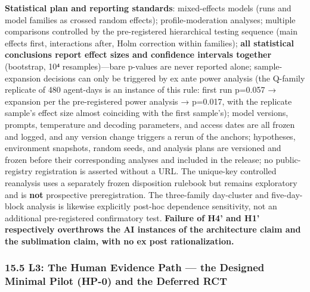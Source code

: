 \documentclass[
  11pt]{article}
\begin{document}
\textbf{Statistical plan and reporting standards}: mixed-effects models
(runs and model families as crossed random effects); profile-moderation
analyses; multiple comparisons controlled by the pre-registered
hierarchical testing sequence (main effects first, interactions after,
Holm correction within families); \textbf{all statistical conclusions
report effect sizes and confidence intervals together} (bootstrap, 10⁴
resamples)---bare p-values are never reported alone; sample-expansion
decisions can only be triggered by ex ante power analysis (the Q-family
replicate of 480 agent-days is an instance of this rule: first run
p=0.057 → expansion per the pre-registered power analysis → p=0.017,
with the replicate sample's effect size almost coinciding with the first
sample's); model versions, prompts, temperature and decoding parameters,
and access dates are all frozen and logged, and any version change
triggers a rerun of the anchors; hypotheses, environment snapshots,
random seeds, and analysis plans are versioned and frozen before their
corresponding analyses and included in the release; no public-registry
registration is asserted without a URL. The unique-key controlled
reanalysis uses a separately frozen disposition rulebook but remains
exploratory and is \textbf{not} prospective preregistration. The
three-family day-cluster and five-day-block analysis is likewise
explicitly post-hoc dependence sensitivity, not an additional
pre-registered confirmatory test. \textbf{Failure of H4' and H1'
respectively overthrows the AI instances of the architecture claim and
the sublimation claim, with no ex post rationalization.}

\subsubsection{15.5 L3: The Human Evidence Path --- the Designed Minimal
Pilot (HP-0) and the Deferred
RCT}\label{l3-the-human-evidence-path-the-designed-minimal-pilot-hp-0-and-the-deferred-rct}
\end{document}
